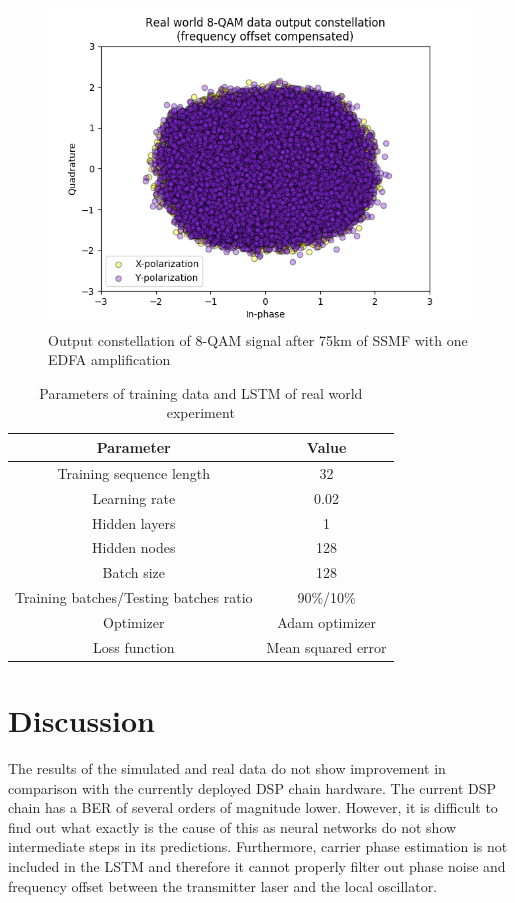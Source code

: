 \documentclass[journal,10pt,twoside, a4paper]{IEEEtran}
\begin{document}
\begin{figure}
    \centering
    \includegraphics[width=\linewidth]{Thesis/images/real_output.png}
    \caption{Output constellation of 8-QAM signal after 75km of SSMF with one EDFA amplification}
    \label{fig:output}
\end{figure}

\begin{table}
    \centering
    \caption{Parameters of training data and LSTM of real world experiment}
    \label{tab:real_parameters}
    \begin{tabular}{c|c}
        Parameter & Value\\
        \hline
        Training sequence length & 32\\
        Learning rate & 0.02\\
        Hidden layers & 1\\
        Hidden nodes & 128\\
        Batch size & 128\\
        Training batches/Testing batches ratio & 90\%/10\%\\
        Optimizer & Adam optimizer\\
        Loss function & Mean squared error\\
    \end{tabular}
\end{table}

\section{Discussion}
The results of the simulated and real data do not show improvement in comparison with the currently deployed DSP chain hardware. The current DSP chain has a BER of several orders of magnitude lower. However, it is difficult to find out what exactly is the cause of this as neural networks do not show intermediate steps in its predictions. Furthermore, carrier phase estimation is not included in the LSTM and therefore it cannot properly filter out phase noise and frequency offset between the transmitter laser and the local oscillator.
\end{document}
